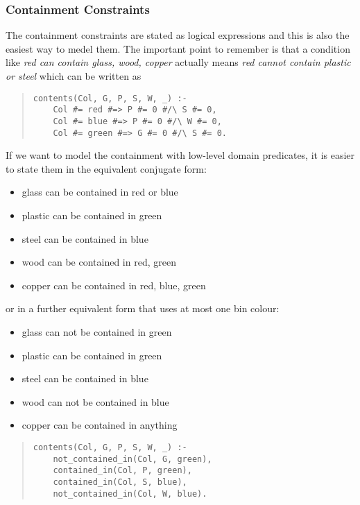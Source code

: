 \subsubsection{Containment Constraints}
The containment constraints are stated as logical expressions
and this is also the easiest way to medel them.
The important point to remember is that a condition like
{\it red can contain glass, wood, copper}
actually means
{\it red cannot contain plastic or steel}
which can be written as

\begin{quote}
\begin{verbatim}
contents(Col, G, P, S, W, _) :-
    Col #= red #=> P #= 0 #/\ S #= 0,
    Col #= blue #=> P #= 0 #/\ W #= 0,
    Col #= green #=> G #= 0 #/\ S #= 0.
\end{verbatim}
\end{quote}

If we want to model the containment with low-level domain predicates,
it is easier to state them in the equivalent conjugate form:
\begin{itemize}
\item glass can be contained in red or blue
\item plastic can be contained in green
\item steel can be contained in blue
\item wood can be contained in red, green
\item copper can be contained in red, blue, green
\end{itemize}

or in a further equivalent form that uses at most one bin colour:
\begin{itemize}
\item glass can not be contained in green
\item plastic can be contained in green
\item steel can be contained in blue
\item wood can not be contained in blue
\item copper can be contained in anything
\end{itemize}

\begin{quote}
\begin{verbatim}
contents(Col, G, P, S, W, _) :-
    not_contained_in(Col, G, green),
    contained_in(Col, P, green),
    contained_in(Col, S, blue),
    not_contained_in(Col, W, blue).
\end{verbatim}
\end{quote}

